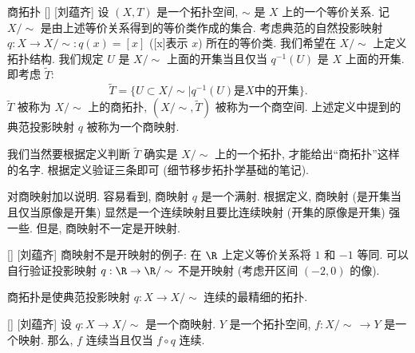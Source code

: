 \documentclass[UTF8]{ctexart}
\begin{document}
        \begin{dfn}
            []
            {商拓扑}
            []
            [刘蕴齐]
            设 \((X,T)\) 是一个拓扑空间,  \(\sim\) 是 \(X\) 上的一个等价关系. 记 \(X / \sim\) 是由上述等价关系得到的等价类作成的集合. 
            考虑典范的自然投影映射 \(q: X \to X/\sim: q(x) = [x]\) ([x]表示 \(x\)) 所在的等价类. 
            我们希望在 \(X / \sim\) 上定义拓扑结构. 我们规定 \(U\) 是 \(X / \sim\) 上面的开集当且仅当 \(q^{-1}(U)\) 是 \(X\) 上面的开集. 即考虑 \(\tilde{T}\):
            \[
                \tilde{T} = \{ U \subset X/\sim | q^{-1}(U) \text{是} X \text{中的开集} \}.
            \]
             \(\tilde{T}\) 被称为 \(X/\sim\) 上的商拓扑,  \((X/\sim,\tilde{T})\) 被称为一个商空间. 上述定义中提到的典范投影映射 \(q\) 被称为一个商映射. 
        \end{dfn}

        \begin{rmk}
            []
            我们当然要根据定义判断 \(\tilde{T}\) 确实是 \(X/\sim\) 上的一个拓扑, 才能给出``商拓扑''这样的名字. 根据定义验证三条即可 (细节移步拓扑学基础的笔记). 
        \end{rmk}

        
        \begin{rmk}
            []
            对商映射加以说明. 容易看到, 商映射 \(q\) 是一个满射. 根据定义, 商映射 (是开集当且仅当原像是开集) 显然是一个连续映射且要比连续映射 (开集的原像是开集) 强一些. 但是, 商映射不一定是开映射. 
        \end{rmk}

        \begin{cxmp}
            []
            {}
            []
            [刘蕴齐]
            商映射不是开映射的例子: 在 \(\R\) 上定义等价关系将 \(1\) 和 \(-1\) 等同. 可以自行验证投影映射 \(q: \R \to \R/\sim\) 不是开映射 (考虑开区间 \((-2,0)\) 的像). 
        \end{cxmp}
        
        \begin{rmk}
            []
            商拓扑是使典范投影映射 \(q: X \to X/\sim\) 连续的最精细的拓扑. 
        \end{rmk}

        \begin{lma}
            []
            {}
            []
            [刘蕴齐]
            设 \(q: X \to X/\sim\) 是一个商映射.  \(Y\) 是一个拓扑空间, \(f: X/\sim \, \to Y\) 是一个映射. 那么,  \(f\) 连续当且仅当 \(f \circ q\) 连续.    
        \end{lma}
\end{document}
